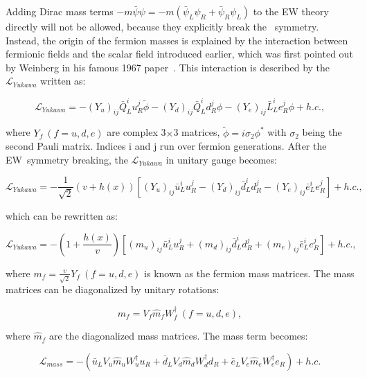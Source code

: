 Adding Dirac mass terms $-m\bar{\psi}\psi=-m(\bar{\psi}_{L}\psi_{R}+\bar{\psi}_{R}\psi_{L})$ to the \ac{EW} theory directly will not be allowed, because they explicitly break the \ew~symmetry. Instead, the origin of the fermion masses is explained by the interaction between fermionic fields and the scalar field introduced earlier, which was first pointed out by Weinberg in his famous 1967 paper~\cite{Weinberg:1967tq}. This interaction is described by the $\mathcal{L}_{Yukawa}$ written as:

\begin{equation}
\mathcal{L}_{Yukawa}=-(Y_{u})_{ij}\bar{Q}_{L}^{i}u_{R}^{j}\tilde{\phi}-(Y_{d})_{ij}\bar{Q}_{L}^{i}d_{R}^{j}\phi-(Y_{e})_{ij}\bar{L}_{L}^{i}e_{R}^{j}\phi + h.c.,
\end{equation}

where $Y_{f}~(f=u,d,e)$ are complex 3$\times$3 matrices, $\tilde{\phi}=i\sigma_{2}\phi^{*}$ with $\sigma_{2}$ being the second Pauli matrix. Indices i and j run over fermion generations. After the \ac{EW}~symmetry breaking, the $\mathcal{L}_{Yukawa}$ in unitary gauge becomes:

\begin{equation}
\mathcal{L}_{Yukawa}=-\frac{1}{\sqrt{2}}(v+h(x))[(Y_{u})_{ij}\bar{u}_{L}^{i}u_{R}^{j}-(Y_{d})_{ij}\bar{d}_{L}^{i}d_{R}^{j}-(Y_{e})_{ij}\bar{e}_{L}^{i}e_{R}^{j}] + h.c.,
\end{equation}

which can be rewritten as:

\begin{equation}
\mathcal{L}_{Yukawa}=-(1+\frac{h(x)}{v})[(m_{u})_{ij}\bar{u}_{L}^{i}u_{R}^{j}+(m_{d})_{ij}\bar{d}_{L}^{i}d_{R}^{j}+(m_{e})_{ij}\bar{e}_{L}^{i}e_{R}^{j}] + h.c.,
\end{equation}

where $m_f=\frac{v}{\sqrt{2}}Y_{f}~(f=u,d,e)$ is known as the fermion mass matrices. The mass matrices can be diagonalized by unitary rotations:

\begin{equation}
m_{f}=V_{f}\hat{m}_{f}W^{\dagger}_{f}~(f=u,d,e),
\end{equation}

where $\hat{m}_{f}$ are the diagonalized mass matrices. The mass term becomes:

\begin{equation}
\mathcal{L}_{mass}=-(\bar{u}_{L}V_{u}\hat{m}_{u}W_{u}^{\dagger}u_{R}+\bar{d}_{L}V_{d}\hat{m}_{d}W^{\dagger}_{d}d_{R}+\bar{e}_{L}V_{e}\hat{m}_{e}W_{e}^{\dagger}e_{R}) + h.c.
\end{equation}

